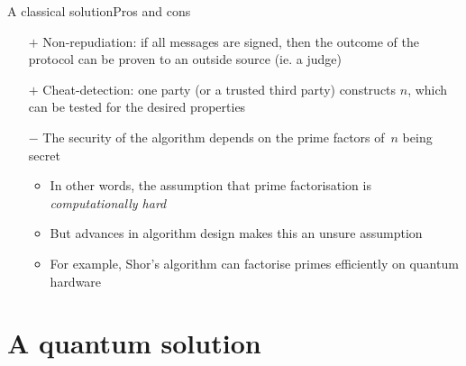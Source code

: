 \documentclass{beamer}
\begin{document}
\begin{frame}{A classical solution}{Pros and cons}
    \begin{itemize}
        \item[$+$] Non-repudiation: if all messages are signed, then the outcome of the protocol can be proven to an outside source (ie. a judge)
        \item[$+$] Cheat-detection: one party (or a trusted third party) constructs $n$, which can be tested for the desired properties
        \item [$-$] The security of the algorithm depends on the prime factors of~$n$ being secret
        \begin{itemize}
            \item In other words, the assumption that prime factorisation is \emph{computationally hard}
            \item But advances in algorithm design makes this an unsure assumption
            \item For example, Shor's algorithm can factorise primes efficiently on quantum hardware~\cite{bernstein2017post}
        \end{itemize}
    \end{itemize}
\end{frame}





\part{A quantum solution~\cite{bennett2014quantum}} \frame{\partpage}
\end{document}
